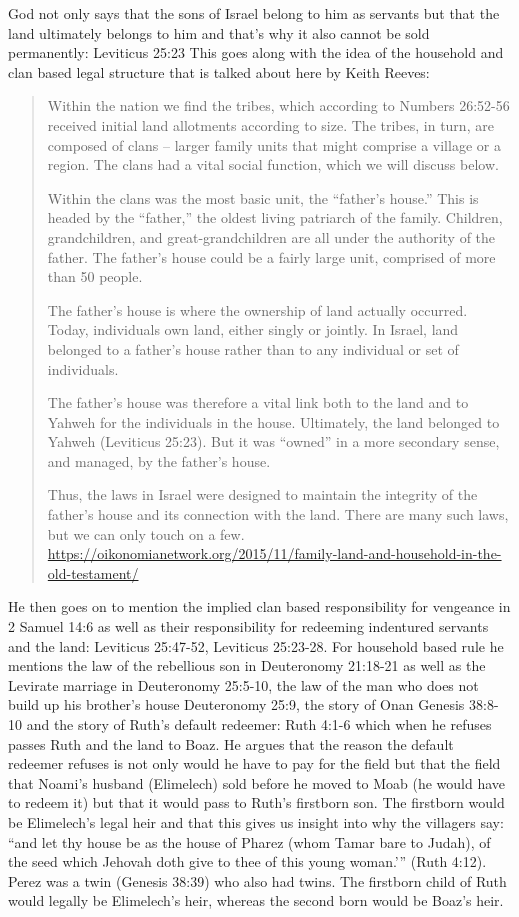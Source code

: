 \documentclass[11pt]{article}
\begin{document}
{God not only says that the sons of Israel belong to him as servants but that the land ultimately belongs to him and that's why it also cannot be sold permanently: Leviticus 25:23 This goes along with the idea of the household and clan based legal structure that is talked about here by Keith Reeves:

\begin{quote}
Within the nation we find the tribes, which according to Numbers 26:52-56 received initial land allotments according to size. The tribes, in turn, are composed of clans – larger family units that might comprise a village or a region. The clans had a vital social function, which we will discuss below.

Within the clans was the most basic unit, the “father’s house.” This is headed by the “father,” the oldest living patriarch of the family. Children, grandchildren, and great-grandchildren are all under the authority of the father. The father’s house could be a fairly large unit, comprised of more than 50 people.

The father’s house is where the ownership of land actually occurred. Today, individuals own land, either singly or jointly. In Israel, land belonged to a father’s house rather than to any individual or set of individuals.

The father’s house was therefore a vital link both to the land and to Yahweh for the individuals in the house. Ultimately, the land belonged to Yahweh (Leviticus 25:23). But it was “owned” in a more secondary sense, and managed, by the father’s house.

Thus, the laws in Israel were designed to maintain the integrity of the father’s house and its connection with the land. There are many such laws, but we can only touch on a few. \url{https://oikonomianetwork.org/2015/11/family-land-and-household-in-the-old-testament/}
\end{quote}

He then goes on to mention the implied clan based responsibility for vengeance in 2 Samuel 14:6 as well as their responsibility for redeeming indentured servants and the land: Leviticus 25:47-52, Leviticus 25:23-28. For household based rule he mentions the law of the rebellious son in Deuteronomy 21:18-21 as well as the Levirate marriage in Deuteronomy 25:5-10, the law of the man who does not build up his brother's house Deuteronomy 25:9, the story of Onan Genesis 38:8-10 and the story of Ruth's default redeemer: Ruth 4:1-6 which when he refuses passes Ruth and the land to Boaz. He argues that the reason the default redeemer refuses is not only would he have to pay for the field but that the field that Noami's husband (Elimelech) sold before he moved to Moab (he would have to redeem it) but that it would pass to Ruth's firstborn son. The firstborn would be Elimelech's legal heir and that this gives us insight into why the villagers say: “and let thy house be as the house of Pharez (whom Tamar bare to Judah), of the seed which Jehovah doth give to thee of this young woman.'” (Ruth 4:12). Perez was a twin (Genesis 38:39) who also had twins. The firstborn child of Ruth would legally be Elimelech’s heir, whereas the second born would be Boaz’s heir. 

}
\end{document}
